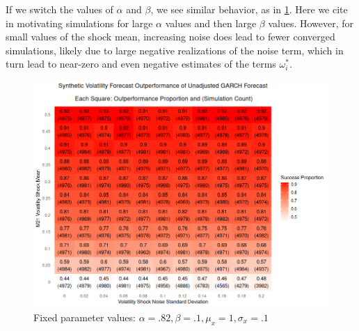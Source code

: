 \documentclass[11pt]{article}
\theoremstyle{definition}
\begin{document}
If we switch the values of $\alpha$ and $\beta$, we see similar behavior, as in \ref{fig:heavy_alpha}.  Here we cite \citet[p. 22]{francq2019garch} in motivating simulations for large $\alpha$ values and then large $\beta$ values.  However, for small values of the shock mean, increasing noise does lead to fewer converged simulations, likely due to large negative realizations of the noise term, which in turn lead to near-zero and even negative estimates of the terms $\omega_{i}^{*}$.
\begin{figure}[h!]
  \begin{center}
    \includegraphics[scale=.45]{simulation_plots/standard_simulation_alpha_.82_beta_.1.png}
    \caption{Fixed parameter values: $\alpha = .82, \beta = .1, \mu_{x} = 1, \sigma_{x} = .1$}
    \label{fig:heavy_alpha}
  \end{center}
  \end{figure}
\end{document}
